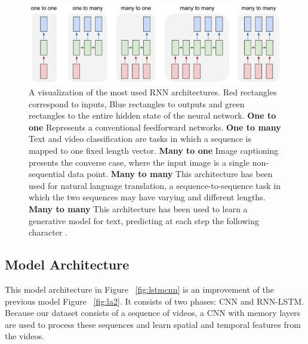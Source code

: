\begin{figure}[ht]
\centering
\includegraphics[width=0.8\columnwidth]{Figures/rn1}
\decoRule
\caption[A visualization of the most used RNN architectures. Red rectangles
correspond to inputs, Blue rectangles to outputs and green rectangles to the entire hidden state of the neural network. \textbf{One to one} Represents a conventional  feedforward networks. \textbf{One to many} Text and video classification are tasks in which a sequence is mapped to one fixed length vector. \textbf{Many to one}
Image captioning presents the converse case, where the input image is a single
non-sequential data point. \textbf{Many to many} This architecture has been used for natural language translation, a sequence-to-sequence task in which the two sequences may
have varying and different lengths. \textbf{Many to many} This architecture has been used to learn
a generative model for text, predicting at each step the following character \citep{lipton2015critical}.]{A visualization of the most used RNN architectures. Red rectangles
correspond to inputs, Blue rectangles to outputs and green rectangles to the entire hidden state of the neural network. \textbf{One to one} Represents a conventional  feedforward networks. \textbf{One to many} Text and video classification are tasks in which a sequence is mapped to one fixed length vector. \textbf{Many to one}
Image captioning presents the converse case, where the input image is a single
non-sequential data point. \textbf{Many to many} This architecture has been used for natural language translation, a sequence-to-sequence task in which the two sequences may
have varying and different lengths. \textbf{Many to many} This architecture has been used to learn
a generative model for text, predicting at each step the following character \citep{lipton2015critical}.}
\label{fig:RNNmanytoonoetypes}
\end{figure}

\subsection{Model Architecture}
This model architecture in Figure ~\ref{fig:lstmcnn} is an improvement of the previous model Figure ~\ref{fig:la2}. It consists of two phases: CNN and RNN-LSTM. Because our dataset consists of a sequence of videos, a CNN with memory layers are used to process these sequences and learn spatial and temporal features from the videos.\\

